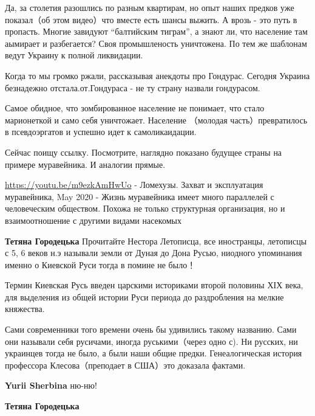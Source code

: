 \begin{itemize}
\begin{itemize}
Да, за столетия разошлись по разным квартирам, но опыт наших предков уже
показал（об этом видео）что вместе есть шансы выжить. А врозь - это путь в
пропасть. Многие завидуют \enquote{балтийским тиграм}, а знают ли, что
население там аымирает и разбегается? Своя промышленость уничтожена. По тем же
шаблонам ведут Украину к полной ликвидации. 

Когда то мы громко ржали, рассказывая анекдоты про Гондурас. Сегодня Украина
безнадежно отстала.от.Гондураса - не ту страну назвали гондурасом.

Самое обидное, что зомбированное население не понимает, что стало марионеткой и
само себя уничтожает. Население （молодая часть）превратилось в псевдоэргатов и
успешно идет к самоликаидации.

Сейчас поищу ссылку. Посмотрите, наглядно показано будущее страны на примере
муравейника. И аналогии прямые.

\url{https://youtu.be/m9ezkAmHwUo} - Ломехузы. Захват и эксплуатация
муравейника, May 2020 - Жизнь муравейника имеет много параллелей с человеческим
обществом. Похожа не только структурная организация, но и взаимоотношение с
другими видами насекомых 

\textbf{Тетяна Городецька} Прочитайте Нестора Летописца, все иностранцы,
летописцы с 5, 6 веков н.э называли земли от Дуная до Дона Русью, ниодного
упоминания именно о Киевской Руси тогда в помине не было！



Термин Киевская Русь введен царскими историками второй половины ХІХ века, для
выделения из общей истории Руси периода до раздробления на мелкие княжества.

Сами современники того времени очень бы удивились такому названию. Сами они
называли себя русичами, иногда руськими（через одно с). Ни русских, ни
украинцев тогда не было, а были наши общие предки. Генеалогическая история
профессора Клесова（преподает в США）это доказала фактами.

\textbf{Yurii Sherbina} ню-ню!


\textbf{Тетяна Городецька} 🤦🐑🐑🐑🐑🐑🐑🐑



\end{itemize}
\end{itemize}
